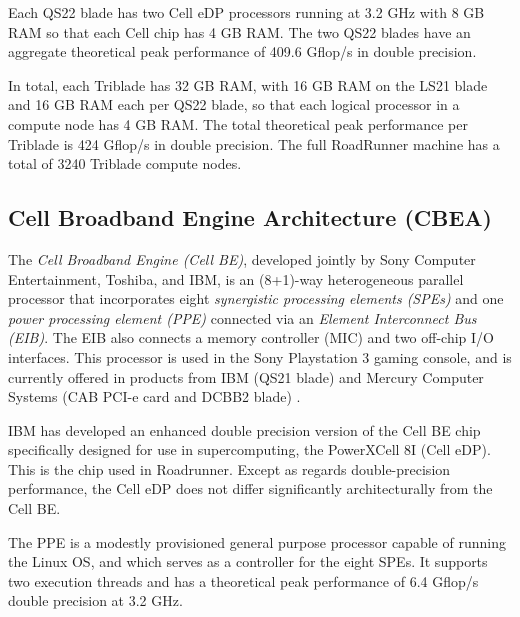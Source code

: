 \documentclass[10pt]{article}
\begin{document}
Each QS22 blade has two Cell eDP processors running at 3.2 GHz
with 8 GB RAM so that each Cell chip has 4 GB RAM.  The two QS22
blades have an aggregate theoretical peak performance of
409.6 Gflop/s in double precision.

In total, each Triblade has 32 GB RAM, with 16 GB RAM on the
LS21 blade and 16 GB RAM each per QS22 blade, so that each
logical processor in a compute node has 4 GB RAM.  The total
theoretical peak performance per Triblade is 424 Gflop/s in
double precision.  The full RoadRunner machine has a total of
3240 Triblade compute nodes.

\subsection{Cell Broadband Engine Architecture (CBEA)}



The \emph{Cell Broadband Engine (Cell BE)}, developed jointly by Sony
Computer Entertainment, Toshiba, and IBM, is an (8+1)-way
heterogeneous parallel processor that incorporates eight
\emph{synergistic processing elements (SPEs)} and one
\emph{power processing element (PPE)} connected via an
\emph{Element Interconnect Bus (EIB)}.  The EIB also connects
a memory controller (MIC) and two off-chip I/O interfaces.  This
processor is used in the Sony Playstation 3 gaming console, and is
currently offered in products from IBM (QS21 blade) and Mercury
Computer Systems (CAB PCI-e card and DCBB2 blade) \cite{mercury}.

IBM has developed an enhanced double precision version of the Cell BE
chip specifically designed for use in supercomputing, the PowerXCell
8I (Cell eDP).  This is the chip used in Roadrunner.  Except as
regards double-precision performance, the Cell eDP does not differ
significantly architecturally from the Cell BE.

The PPE is a modestly provisioned general purpose processor capable of
running the Linux OS, and which serves as a controller for the eight
SPEs.  It supports two execution threads and has a theoretical peak
performance of 6.4 Gflop/s double precision at 3.2 GHz.
\end{document}

